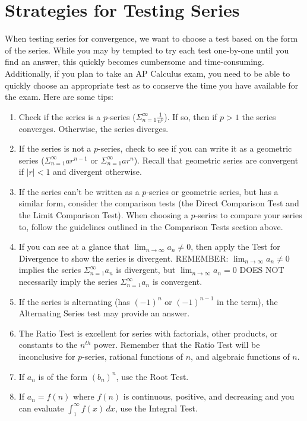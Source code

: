 \section{Strategies for Testing Series}
When testing series for convergence, we want to choose a test based on the 
form of the series. While you may by tempted to try each test one-by-one until 
you find an answer, this quickly becomes cumbersome and time-consuming. 
Additionally, if you plan to take an AP Calculus exam, you need to be able to 
quickly choose an appropriate test as to conserve the time you have available 
for the exam. Here are some tips:
\begin{enumerate}
\item Check if the series is a $p$-series ($\Sigma_{n=1}^\infty \frac{1}{n^p}$). 
If so, then if $p > 1$ the series converges. Otherwise, the series diverges.
\item If the series is not a $p$-series, check to see if you can write it as a 
geometric series ($\Sigma_{n=1}^\infty ar^{n-1}$ or $\Sigma_{n=1}^\infty ar^n$). 
Recall that geometric series are convergent if $|r| < 1$ and divergent otherwise.
\item If the series can't be written as a $p$-series or geometric series, but 
has a similar form, consider the comparison tests (the Direct Comparison Test 
and the Limit Comparison Test). When choosing a $p$-series to compare your 
series to, follow the guidelines outlined in the Comparison Tests section 
above. 
\item If you can see at a glance that $\lim_{n \to \infty} a_n \neq 0$, then 
apply the Test for Divergence to show the series is divergent. REMEMBER: $\lim_
{n \to \infty} a_n \neq 0$ implies the series $\Sigma_{n=1}^\infty a_n$ is 
divergent, but $\lim_{n \to \infty} a_n = 0$ DOES NOT necessarily imply the 
series $\Sigma_{n=1}^\infty a_n$ is convergent. 
\item If the series is alternating (has $(-1)^n$ or $(-1)^{n-1}$ in the term), 
the Alternating Series test may provide an answer. 
\item The Ratio Test is excellent for series with factorials, other products, 
or constants to the $n^{th}$ power. Remember that the Ratio Test will be 
inconclusive for $p$-series, rational functions of $n$, and algebraic functions 
of $n$. 
\item If $a_n$ is of the form $(b_n)^n$, use the Root Test. 
\item If $a_n = f(n)$ where $f(n)$ is continuous, positive, and decreasing and 
you can evaluate $\int_1^\infty f(x)\,dx$, use the Integral Test. 
\end{enumerate}

